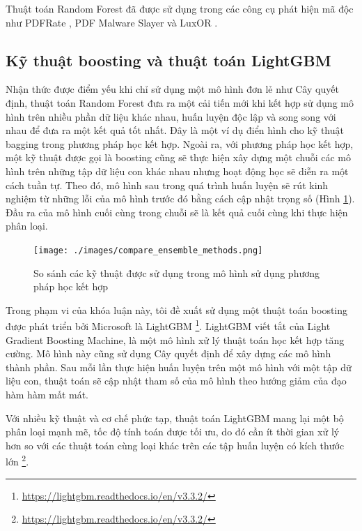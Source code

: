 \documentclass[./../main.tex]{subfiles}
\begin{document}
Thuật toán Random Forest đã được sử dụng trong các công cụ phát hiện mã độc như PDFRate \cite{pdfrate}, PDF Malware Slayer \cite{slayer} và LuxOR \cite{luxor}.

\subsection{Kỹ thuật boosting và thuật toán LightGBM}
Nhận thức được điểm yếu khi chỉ sử dụng một mô hình đơn lẻ như Cây quyết định, thuật toán Random Forest đưa ra một cải tiến mới khi kết hợp sử dụng mô hình trên nhiều phần dữ liệu khác nhau, huấn luyện độc lập và song song với nhau để đưa ra một kết quả tốt nhất. Đây là một ví dụ điển hình cho kỹ thuật bagging trong phương pháp học kết hợp. Ngoài ra, với phương pháp học kết hợp, một kỹ thuật được gọi là boosting cũng sẽ thực hiện xây dựng một chuỗi các mô hình trên những tập dữ liệu con khác nhau nhưng hoạt động học sẽ diễn ra một cách tuần tự. Theo đó, mô hình sau trong quá trình huấn luyện sẽ rút kinh nghiệm từ những lỗi của mô hình trước đó bằng cách cập nhật trọng số (Hình \ref{fig:compare_ensemble_methods}). Đầu ra của mô hình cuối cùng trong chuỗi sẽ là kết quả cuối cùng khi thực hiện phân loại.

\begin{figure}[ht!]
	\centering
	\texttt{[image: ./images/compare\_ensemble\_methods.png]}
	\caption{So sánh các kỹ thuật được sử dụng trong mô hình sử dụng phương pháp học kết hợp\protect\footnotemark}
	\label{fig:compare_ensemble_methods}
\end{figure}


Trong phạm vi của khóa luận này, tôi đề xuất sử dụng một thuật toán boosting được phát triển bởi Microsoft là LightGBM \footnote{\url{https://lightgbm.readthedocs.io/en/v3.3.2/}}. LightGBM viết tắt của Light Gradient Boosting Machine, là một mô hình xử lý thuật toán học kết hợp tăng cường. Mô hình này cũng sử dụng Cây quyết định để xây dựng các mô hình thành phần. Sau mỗi lần thực hiện huấn luyện trên một mô hình với một tập dữ liệu con, thuật toán sẽ cập nhật tham số của mô hình theo hướng giảm của đạo hàm hàm mất mát.

Với nhiều kỹ thuật và cơ chế phức tạp, thuật toán LightGBM mang lại một bộ phân loại mạnh mẽ, tốc độ tính toán được tối ưu, do đó cần ít thời gian xử lý hơn so với các thuật toán cùng loại khác trên các tập huấn luyện có kích thước lớn \footnote{\url{https://lightgbm.readthedocs.io/en/v3.3.2/}}.
\end{document}
